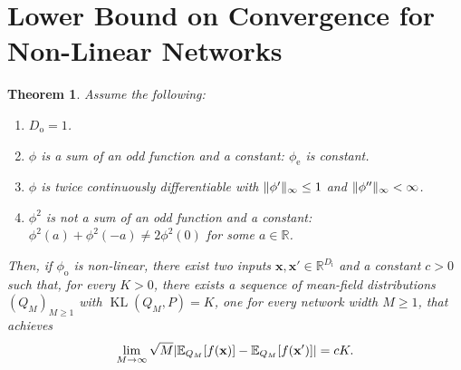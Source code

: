 \documentclass[twoside]{article}
\renewcommand{\ss}[1]{_{\text{#1}}}
\newcommand{\vx}{\mathbf{x}}
\newcommand{\E}{\mathbb{E}}
\renewcommand{\P}{\mathbb{P}}
\newcommand{\Q}{\mathbb{Q}}
\renewcommand{\Q}{\ensuremath{Q}}
\renewcommand{\P}{\ensuremath{P}}
\newcommand{\R}{\mathbb{R}}
\newcommand{\KL}{\operatorname{KL}}
\renewcommand{\ss}[1]{_{\text{#1}}}        %
\DeclarePairedDelimiter\norm{\|}{\|}             %
\DeclarePairedDelimiter\abs{|}{|}                %
\theoremstyle{theoremstyle}
\newtheorem{theorem}{Theorem}
\begin{document}
\section{Lower Bound on Convergence for Non-Linear Networks}\label{app:convergence-lower-bound}

\begin{theorem}
    Assume the following:
    \begin{enumerate}[label=(\roman*),topsep=0pt]
        \item $D\ss{o} = 1$.
        \item $\phi$ is a sum of an odd function and a constant: $\phi\ss{e}$ is constant.
        \item $\phi$ is twice continuously differentiable with $\norm{\phi'}_\infty \le 1$ and $\norm{\phi''}_\infty < \infty$.
        \item $\phi^2$ is not a sum of an odd function and a constant: $\phi^2(a) + \phi^2(-a) \neq 2 \phi^2(0)$ for some $a \in \R$.
    \end{enumerate}
    Then, if $\phi\ss{o}$ is non-linear, there exist two inputs $\vx, \vx' \in \R^{D\ss{i}}$ and a constant $c > 0$ such that, for every $K > 0$, there exists a sequence of mean-field distributions $(\Q_M)_{M \ge 1}$ with $\KL(\Q_M, \P) = K $, one for every network width $M \ge 1$, that achieves
    \begin{equation}
        \lim_{M \to \infty} \sqrt{M}\abs{\E_{\Q_M}[f(\vx)] - \E_{\Q_M}[f(\vx')]} = c K.
    \end{equation}
\end{theorem}
\end{document}
